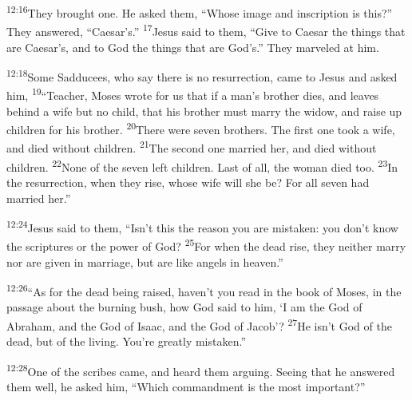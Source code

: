 \documentclass[openany,12pt,english]{book}
\newenvironment{para}{\par\pretolerance=100\tolerance=200\setlength{\emergencystretch}{0.6em}\relax}{\par}
\begin{document}
\begin{para}
    \textsuperscript{12:16}\thinspace{}They brought one. He asked them, “Whose im\-age and in\-scrip\-tion is this?” They answered, “Caesar's.”
    \textsuperscript{17}\thinspace{}Jesus said to them, “Give to Caesar the things that are Caesar's, and to God the things that are God's.” They mar\-veled at him.
\end{para}

\bigskip{}

\begin{para}
    \textsuperscript{12:18}\thinspace{}Some Sadducees, who say there is no res\-ur\-rec\-tion, came to Jesus and asked him,
    \textsuperscript{19}\thinspace{}“Teach\-er, Mo\-ses wrote for us that if a man's broth\-er dies, and leaves be\-hind a wife but no child, that his broth\-er must mar\-ry the wid\-ow, and raise up chil\-dren for his broth\-er.
    \textsuperscript{20}\thinspace{}There were sev\-en brothers. The first one took a wife, and died with\-out chil\-dren.
    \textsuperscript{21}\thinspace{}The sec\-ond one mar\-ried her, and died with\-out chil\-dren.
    \textsuperscript{22}\thinspace{}None of the sev\-en left chil\-dren. Last of all, the wom\-an died too.
    \textsuperscript{23}\thinspace{}In the res\-ur\-rec\-tion, when they rise, whose wife will she be? For all sev\-en had mar\-ried her.”
\end{para}

\begin{para}
    \textsuperscript{12:24}\thinspace{}Jesus said to them, “Is\-n't this the rea\-son you are mis\-tak\-en: you don't know the scriptures or the pow\-er of God?
    \textsuperscript{25}\thinspace{}For when the dead rise, they nei\-ther mar\-ry nor are giv\-en in mar\-riage, but are like angels in heav\-en.”
\end{para}

\begin{para}
    \textsuperscript{12:26}\thinspace{}“As for the dead be\-ing raised, have\-n't you read in the book of Mo\-ses, in the pas\-sage a\-bout the burn\-ing bush, how God said to him, ‘I am the God of Abraham, and the God of Isaac, and the God of Jacob’?
    \textsuperscript{27}\thinspace{}He is\-n't God of the dead, but of the liv\-ing. You're great\-ly mis\-tak\-en.”
\end{para}

\begin{para}
    \textsuperscript{12:28}\thinspace{}One of the scribes came, and heard them ar\-gu\-ing. See\-ing that he answered them well, he asked him, “Which com\-mand\-ment is the most im\-por\-tant?”
\end{para}
\end{document}
